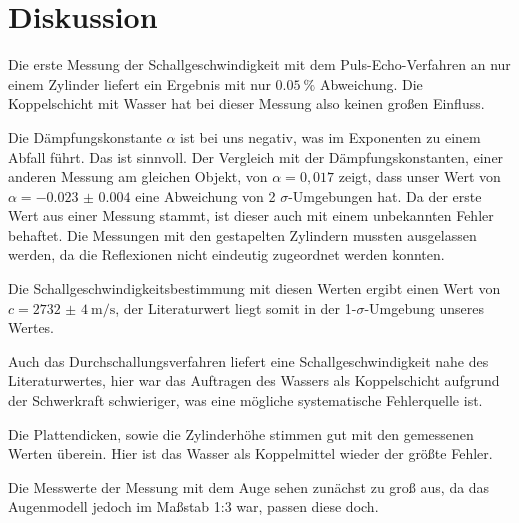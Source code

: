 \section{Diskussion}
\label{sec:Diskussion}
Die erste Messung der Schallgeschwindigkeit mit dem Puls-Echo-Verfahren an nur
einem Zylinder liefert ein Ergebnis mit nur $\SI{0.05}{\percent}$ Abweichung.
Die Koppelschicht mit Wasser hat bei dieser Messung also keinen großen Einfluss.

Die Dämpfungskonstante $α$ ist bei uns negativ, was im Exponenten zu einem Abfall
führt. Das ist sinnvoll.
Der Vergleich mit der Dämpfungskonstanten, einer anderen Messung am gleichen Objekt,
von $α = 0,017$ \cite{daempf} zeigt, dass unser Wert von $α = \num{-0.023(4)}$ eine Abweichung von
2 $σ$-Umgebungen hat. Da der erste Wert aus einer Messung stammt, ist dieser auch mit
einem unbekannten Fehler behaftet.
Die Messungen mit den gestapelten Zylindern mussten
ausgelassen werden, da die Reflexionen nicht eindeutig zugeordnet werden konnten.

Die Schallgeschwindigkeitsbestimmung mit diesen Werten ergibt einen Wert von\\
$c = \SI{2732(4)}{\meter\per\second}$, der Literaturwert liegt somit in der
1-$σ$-Umgebung unseres Wertes.

Auch das Durchschallungsverfahren liefert eine Schallgeschwindigkeit nahe des
Literaturwertes, hier war das Auftragen des Wassers als Koppelschicht
aufgrund der Schwerkraft schwieriger, was eine mögliche systematische Fehlerquelle ist.

Die Plattendicken, sowie die Zylinderhöhe stimmen gut mit den gemessenen Werten
überein. Hier ist das Wasser als Koppelmittel wieder der größte Fehler.

Die Messwerte der Messung mit dem Auge sehen zunächst zu groß aus, da das Augenmodell
jedoch im Maßstab 1:3 war, passen diese doch.
